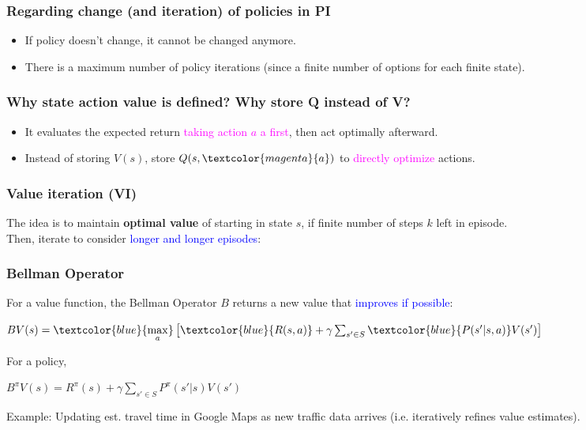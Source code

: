 \documentclass{article}
\begin{document}
\begin{hintbox}
    \subsubsection*{Regarding change (and iteration) of policies in PI}
    \begin{prfbox}
        \begin{itemize}
            \item If policy doesn't change, it cannot be changed anymore.
            \item There is a maximum number of policy iterations (since a finite number of options for each finite state).
        \end{itemize}
    \end{prfbox}
    \subsubsection*{Why state action value is defined? Why store Q instead of V?}
    \begin{prfbox}
        \begin{itemize}
            \item It evaluates the expected return \textcolor{magenta}{taking action $a$ a first}, then act optimally afterward.
            \item Instead of storing $V(s)$, store $Q(s, \textcolor{magenta}{a})$ to \textcolor{magenta}{directly optimize} actions.
        \end{itemize}
    \end{prfbox}
\end{hintbox}

\subsubsection{Value iteration (VI)}
The idea is to maintain \textbf{optimal value} of starting in state $s$, if finite number of steps $k$ left in episode.
\\Then, iterate to consider \textcolor{blue}{longer and longer episodes}:
\begin{defbox}
    \subsubsection*{Bellman Operator}
    For a value function, the Bellman Operator $B$ returns a new value that \textcolor{blue}{improves if possible}:
    \begin{center}
        $BV(s) = \textcolor{blue}{\mathop{\max}\limits_{a}} \left[\textcolor{blue}{R(s, a)} + \gamma \sum_{s' \in S} \textcolor{blue}{P(s' | s, a)} V(s')\right]$
    \end{center}
    For a policy,
    \begin{center}
        $B^{\pi} V(s) = R^{\pi} (s) + \gamma \sum_{s' \in S} P^{\pi} (s' | s) V(s')$
    \end{center}
    \begin{expbox}
        Example: Updating est. travel time in Google Maps as new traffic data arrives (i.e. iteratively refines value estimates).
    \end{expbox}
\end{defbox}
\end{document}
